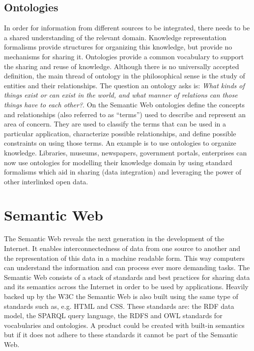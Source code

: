 \subsection{Ontologies}
In order for information from different sources to be integrated, there needs to be a shared understanding of the relevant domain. Knowledge representation formalisms provide structures for organizing this knowledge, but provide no mechanisms for sharing it. Ontologies provide a common vocabulary to support the sharing and reuse of knowledge. Although there is no universally accepted definition, the main thread of ontology in the philosophical sense is the study of entities and their relationships. The question an ontology asks is: \textit{What kinds of things exist or can exist in the world, and what manner of relations can those things have to each other?}. On the Semantic Web ontologies define the concepts and relationships (also referred to as “terms”) used to describe and represent an area of concern. They are used to classify the terms that can be used in a particular application, characterize possible relationships, and define possible constraints on using those terms. An example is to use ontologies to organize knowledge. Libraries, museums, newspapers, government portals, enterprises can now use ontologies for modelling their knowledge domain by using standard formalisms which aid in sharing (data integration) and leveraging the power of other interlinked open data.

\section{Semantic Web}
The Semantic Web reveals the next generation in the development of the Internet. It enables interconnectedness of data from one source to another and the representation of this data in a machine readable form. This way computers can understand the information and can process ever more demanding tasks. The Semantic Web consists of a stack of standards and best practices for sharing data and its semantics across the Internet in order to be used by applications. Heavily backed up by the W3C the Semantic Web is also built using the same type of standards such as, e.g. HTML and CSS. These standards are: the RDF data model, the SPARQL query language, the RDFS and OWL standards for vocabularies and ontologies. A product could be created with built-in semantics but if it does not adhere to these standards it cannot be part of the Semantic Web. 


